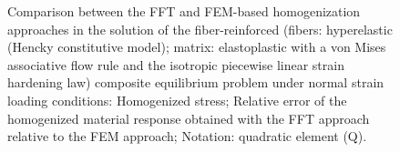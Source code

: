 \begin{figure}[hbt]
\begin{subfigure}[b]{0.49\textwidth}
      \caption{}
      \label{subfig:von_mises_res_mat_large_strain_2D_normal_material_response_error}
    \end{subfigure}
  \caption{Comparison between the FFT and FEM-based homogenization approaches in the solution of the fiber-reinforced (fibers: hyperelastic (Hencky constitutive model); matrix: elastoplastic with a von Mises associative flow rule and the isotropic piecewise linear strain hardening law) composite equilibrium problem under normal strain loading conditions:  Homogenized stress;  Relative error of the homogenized material response obtained with the FFT approach relative to the FEM approach; Notation: quadratic element (Q).}
\label{fig:von_mises_res_mat_large_strain_2D_normal_material_response_and_error}
\end{figure}

